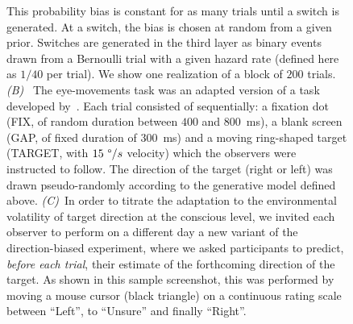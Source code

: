 \documentclass[10pt,letterpaper]{article}
\newcommand{\ms}{\si{\milli\second}}%
\newcommand{\citet}[1]{\cite{#1}}
\begin{document}
\begin{figure}
{This probability bias is constant for as many trials until a switch is generated.
At a switch, the bias is chosen at random from a given prior.
Switches are generated in the third layer as binary events drawn from a Bernoulli trial
with a given hazard rate (defined here as $1/40$ per trial). We show one realization of a block of $200$ trials.
\textit{(B)}~
The eye-movements task was an adapted version of a task developed by~\citet{Montagnini2010}.
Each trial consisted of sequentially:
a fixation dot (FIX, of random duration between $400$ and $800$~\ms),
a blank screen (GAP, of fixed duration of  $300$~\ms) and
a moving ring-shaped target (TARGET, with $15~\degree/s$ velocity) which the observers were instructed to follow.
The direction of the target (right or left) was drawn pseudo-randomly
according to the generative model defined above.
\textit{(C)}~In order to titrate the adaptation
to the environmental volatility of target direction at the conscious level,
we invited each observer to perform on a different day a new variant of the direction-biased experiment,
where we asked participants to predict, \emph{before each trial}, %
their estimate of the forthcoming direction of the target.
As shown in this sample screenshot,
this was performed by moving a mouse cursor (black triangle) on a continuous rating scale
between ``Left'', to ``Unsure'' and finally ``Right''.
}
\label{fig:intro}
\end{figure}
\end{document}
